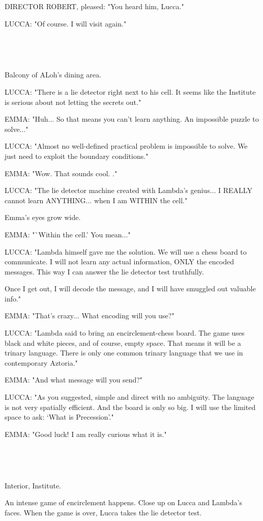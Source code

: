 \documentclass[11pt]{article}
\begin{document}
DIRECTOR ROBERT, pleased: "You heard him, Lucca."

LUCCA: "Of course. I will visit again."

\ 

\ 

Balcony of ALoh's dining area.

LUCCA: "There is a lie detector right next to his cell. 
It seems like the Institute is serious about not letting the secrets out."

EMMA: "Huh... So that means you can't learn anything.
An impossible puzzle to solve..."

LUCCA: "Almost no well-defined practical problem is impossible to solve.
We just need to exploit the boundary conditions."

EMMA: "Wow. That sounds cool. ."

LUCCA: "The lie detector machine created with Lambda's genius... 
I REALLY cannot learn ANYTHING... when I am WITHIN the cell."

Emma's eyes grow wide.

EMMA: "`Within the cell.' You mean..."

LUCCA: "Lambda himself gave me the solution.
We will use a chess board to communicate.
I will not learn any actual information, ONLY the encoded messages.
This way I can answer the lie detector test truthfully.

Once I get out, I will decode the message, and I will have smuggled out valuable info."

EMMA: "That's crazy...
What encoding will you use?"

LUCCA: "Lambda said to bring an encirclement-chess board.
The game uses black and white pieces, and of course, empty space.
That means it will be a trinary language.
There is only one common trinary language that we use in contemporary Aztoria."

EMMA: "And what message will you send?"

LUCCA: "As you suggested, simple and direct with no ambiguity.
The language is not very spatially efficient.
And the board is only so big.
I will use the limited space to ask:
`What is Precession'."

EMMA: "Good luck! I am really curious what it is."

\ 

\ 

Interior, Institute. 

An intense game of encirclement happens.
Close up on Lucca and Lambda's faces.
When the game is over, Lucca takes the lie detector test.
\end{document}
